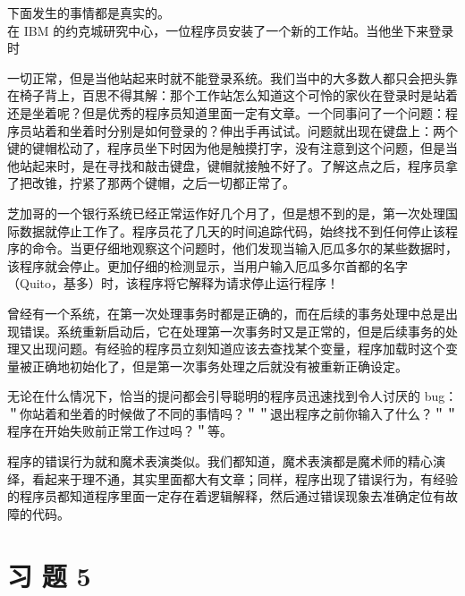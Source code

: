 \documentclass[10pt]{article}
\begin{document}
下面发生的事情都是真实的。\\
在 IBM 的约克城研究中心，一位程序员安装了一个新的工作站。当他坐下来登录时

一切正常，但是当他站起来时就不能登录系统。我们当中的大多数人都只会把头靠在椅子背上，百思不得其解：那个工作站怎么知道这个可怜的家伙在登录时是站着还是坐着呢？但是优秀的程序员知道里面一定有文章。一个同事问了一个问题：程序员站着和坐着时分别是如何登录的？伸出手再试试。问题就出现在键盘上：两个键的键帽松动了，程序员坐下时因为他是触摸打字，没有注意到这个问题，但是当他站起来时，是在寻找和敲击键盘，键帽就接触不好了。了解这点之后，程序员拿了把改锥，拧紧了那两个键帽，之后一切都正常了。

芝加哥的一个银行系统已经正常运作好几个月了，但是想不到的是，第一次处理国际数据就停止工作了。程序员花了几天的时间追踪代码，始终找不到任何停止该程序的命令。当更仔细地观察这个问题时，他们发现当输入厄瓜多尔的某些数据时，该程序就会停止。更加仔细的检测显示，当用户输入厄瓜多尔首都的名字（Quito，基多）时，该程序将它解释为请求停止运行程序！

曾经有一个系统，在第一次处理事务时都是正确的，而在后续的事务处理中总是出现错误。系统重新启动后，它在处理第一次事务时又是正常的，但是后续事务的处理又出现问题。有经验的程序员立刻知道应该去查找某个变量，程序加载时这个变量被正确地初始化了，但是第一次事务处理之后就没有被重新正确设定。

无论在什么情况下，恰当的提问都会引导聪明的程序员迅速找到令人讨厌的 bug： ＂你站着和坐着的时候做了不同的事情吗？＂＂退出程序之前你输入了什么？＂＂程序在开始失败前正常工作过吗？＂等。

程序的错误行为就和魔术表演类似。我们都知道，魔术表演都是魔术师的精心演绎，看起来于理不通，其实里面都大有文章；同样，程序出现了错误行为，有经验的程序员都知道程序里面一定存在着逻辑解释，然后通过错误现象去准确定位有故障的代码。

\section*{习 题 5}
\end{document}
